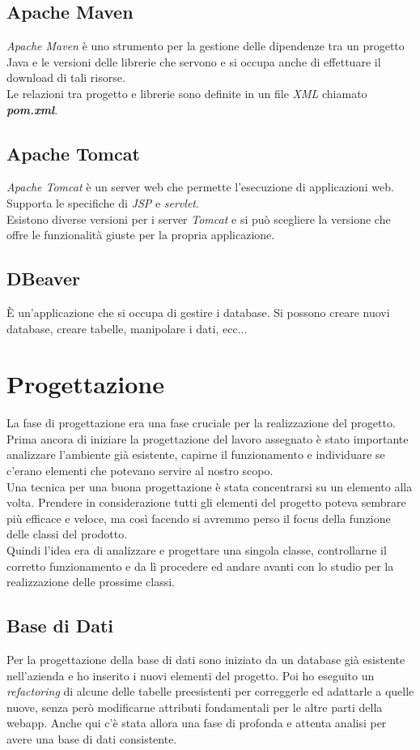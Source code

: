 \subsection*{Apache Maven}
\textit{Apache Maven} è uno strumento per la gestione delle dipendenze tra un progetto Java e le versioni delle librerie che servono e si occupa anche di effettuare il download di tali risorse. \\
Le relazioni tra progetto e librerie sono definite in un file \textit{XML} chiamato \textit{\textbf{pom.xml}}.

\subsection*{Apache Tomcat}
\textit{Apache Tomcat} è un server web che permette l'esecuzione di applicazioni web. Supporta le specifiche di \textit{JSP} e \textit{servlet}.\\
Esistono diverse versioni per i server \textit{Tomcat} e si può scegliere la versione che offre le funzionalità giuste per la propria applicazione.
\subsection*{DBeaver}
È un'applicazione che si occupa di gestire i database. Si possono creare nuovi database, creare tabelle, manipolare i dati, ecc...

\section{Progettazione}
\label{sec:progettazione}
La fase di progettazione era una fase cruciale per la realizzazione del progetto. Prima ancora di iniziare la progettazione del lavoro assegnato è stato importante analizzare l'ambiente già esistente, capirne il funzionamento e individuare se c'erano elementi che potevano servire al nostro scopo. \\
Una tecnica per una buona progettazione è stata concentrarsi su un elemento alla volta. Prendere in considerazione tutti gli elementi del progetto poteva sembrare più efficace e veloce, ma così facendo si avremmo perso il focus della funzione delle classi del prodotto.\\ 
Quindi l'idea era di analizzare e progettare una singola classe, controllarne il corretto funzionamento e da lì procedere ed andare avanti con lo studio per la realizzazione delle prossime classi.


\subsection{Base di Dati}
Per la progettazione della base di dati sono iniziato da un database già esistente nell'azienda e ho inserito i nuovi elementi del progetto. Poi ho eseguito un \textit{refactoring} di alcune delle tabelle preesistenti per correggerle ed adattarle a quelle nuove, senza però modificarne attributi fondamentali per le altre parti della webapp. Anche qui c'è stata allora una fase di profonda e attenta analisi per avere una base di dati consistente. 
